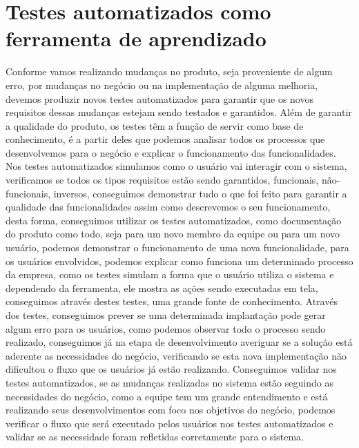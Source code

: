     \section{Testes automatizados como ferramenta de aprendizado}
      Conforme vamos realizando mudanças no produto, seja proveniente de algum erro,
      por mudanças no negócio ou na implementação de alguma melhoria, devemos produzir
      novos testes automatizados para garantir que os novos requisitos dessas mudanças
      estejam sendo testados e garantidos. \newline
      Além de garantir a qualidade do produto, os testes têm a função de servir
      como base de conhecimento, é a partir deles que podemos analisar todos os
      processos que desenvolvemos para o negócio e explicar o funcionamento das
      funcionalidades. Nos testes automatizados simulamos como o usuário vai
      interagir com o sistema, verificamos se todos os tipos requisitos estão
      sendo garantidos, funcionais, não-funcionais, inversos, conseguimos demonstrar
      tudo o que foi feito para garantir a qualidade das funcionalidades assim
      como descrevemos o seu funcionamento, desta forma, conseguimos utilizar os
      testes automatizados, como documentação do produto como todo, seja para um
      novo membro da equipe ou para um novo usuário, podemos demonstrar o funcionamento
      de uma nova funcionalidade, para os usuários envolvidos, podemos explicar
      como funciona um determinado processo da empresa, como os testes simulam
      a forma que o usuário utiliza o sistema e dependendo da ferramenta, ele
      mostra as ações sendo executadas em tela, conseguimos através destes testes,
      uma grande fonte de conhecimento. Através dos testes, conseguimos prever se
      uma determinada implantação pode gerar algum erro para os usuários, como
      podemos observar todo o processo sendo realizado, conseguimos já na etapa
      de desenvolvimento averiguar se a solução está aderente as necessidades do
      negócio, verificando se esta nova implementação não dificultou o fluxo que
      os usuários já estão realizando. Conseguimos validar nos testes automatizados,
      se as mudanças realizadas no sistema estão seguindo as necessidades do negócio,
      como a equipe tem um grande entendimento e está realizando seus desenvolvimentos
      com foco nos objetivos do negócio, podemos verificar o fluxo que será executado
      pelos usuários nos testes automatizados e validar se as necessidade foram
      refletidas corretamente para o sistema. \newline
